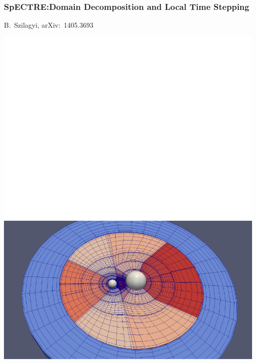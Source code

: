 \documentclass[svgnames,tikz,serif,ragged2e]{beamer}
\begin{document}
\begin{frame}
  \frametitle{SpECTRE:\@ Domain Decomposition and Local Time Stepping}
  B.~Szilagyi, arXiv:~1405.3693
  \vspace{-0.4cm}
  \begin{center}
    \includegraphics[height=.72\textheight]{CutSphere_SphereC0AndInterior}
  \end{center}
\end{frame}
\end{document}
